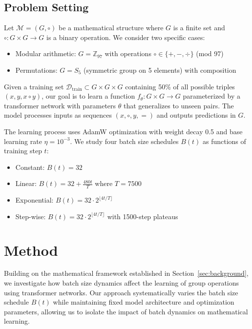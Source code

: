 \documentclass{article} %
\begin{document}
\subsection{Problem Setting}
Let $\mathcal{M} = (G, \circ)$ be a mathematical structure where $G$ is a finite set and $\circ: G \times G \rightarrow G$ is a binary operation. We consider two specific cases:
\begin{itemize}
    \item Modular arithmetic: $G = \mathbb{Z}_{97}$ with operations $\circ \in \{+, -, \div\}$ (mod 97)
    \item Permutations: $G = S_5$ (symmetric group on 5 elements) with composition
\end{itemize}

Given a training set $\mathcal{D}_{\text{train}} \subset G \times G \times G$ containing 50\% of all possible triples $(x, y, x \circ y)$, our goal is to learn a function $f_\theta: G \times G \rightarrow G$ parameterized by a transformer network with parameters $\theta$ that generalizes to unseen pairs. The model processes inputs as sequences $(x, \circ, y, =)$ and outputs predictions in $G$.

The learning process uses AdamW optimization with weight decay 0.5 and base learning rate $\eta = 10^{-3}$. We study four batch size schedules $B(t)$ as functions of training step $t$:
\begin{itemize}
    \item Constant: $B(t) = 32$
    \item Linear: $B(t) = 32 + \frac{480t}{T}$ where $T=7500$
    \item Exponential: $B(t) = 32 \cdot 2^{\lfloor 4t/T \rfloor}$
    \item Step-wise: $B(t) = 32 \cdot 2^{\lfloor 4t/T \rfloor}$ with 1500-step plateaus
\end{itemize}

\section{Method}
\label{sec:method}

Building on the mathematical framework established in Section~\ref{sec:background}, we investigate how batch size dynamics affect the learning of group operations using transformer networks. Our approach systematically varies the batch size schedule $B(t)$ while maintaining fixed model architecture and optimization parameters, allowing us to isolate the impact of batch dynamics on mathematical learning.
\end{document}
